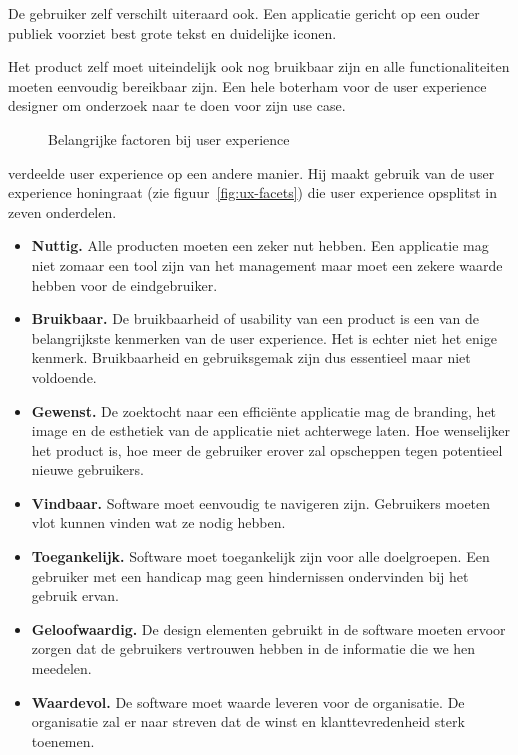De gebruiker zelf verschilt uiteraard ook. Een applicatie gericht op een ouder publiek voorziet best grote tekst en duidelijke iconen.

Het product zelf moet uiteindelijk ook nog bruikbaar zijn en alle functionaliteiten moeten eenvoudig bereikbaar zijn.
Een hele boterham voor de user experience designer om onderzoek naar te doen voor zijn use case.

\begin{figure}
    \centering
    \def\svgwidth{.8\columnwidth}
    
    \caption{Belangrijke factoren bij user experience}
    \label{fig:ux-factoren}
\end{figure}

\textcite{Morville2004} verdeelde user experience op een andere manier. Hij maakt gebruik van de user experience honingraat (zie figuur~\ref{fig:ux-facets}) die user experience opsplitst in zeven onderdelen.


\begin{itemize}
    \item \textbf{Nuttig.}
    Alle producten moeten een zeker nut hebben. Een applicatie mag niet zomaar een tool zijn van het management maar moet een zekere waarde hebben voor de eindgebruiker.
    \item \textbf{Bruikbaar.}
    De bruikbaarheid of usability van een product is een van de belangrijkste kenmerken van de user experience. Het is echter niet het enige kenmerk. Bruikbaarheid en gebruiksgemak zijn dus essentieel maar niet voldoende.
    \item \textbf{Gewenst.}
    De zoektocht naar een efficiënte applicatie mag de branding, het image en de esthetiek van de applicatie niet achterwege laten. Hoe wenselijker het product is, hoe meer de gebruiker erover zal opscheppen tegen potentieel nieuwe gebruikers.
    \item \textbf{Vindbaar.}
    Software moet eenvoudig te navigeren zijn. Gebruikers moeten vlot kunnen vinden wat ze nodig hebben.
    \item \textbf{Toegankelijk.}
    Software moet toegankelijk zijn voor alle doelgroepen. Een gebruiker met een handicap mag geen hindernissen ondervinden bij het gebruik ervan.
    \item \textbf{Geloofwaardig.}
    De design elementen gebruikt in de software moeten ervoor zorgen dat de gebruikers vertrouwen hebben in de informatie die we hen meedelen.
    \item \textbf{Waardevol.}
    De software moet waarde leveren voor de organisatie. De organisatie zal er naar streven dat de winst en klanttevredenheid sterk toenemen.
\end{itemize}

